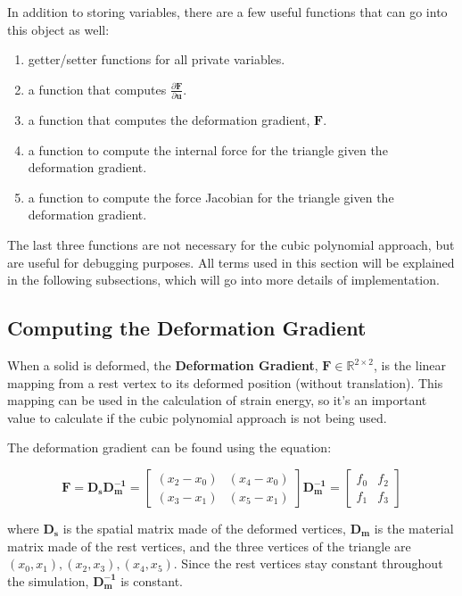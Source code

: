 \documentclass[twocolumn,10pt]{asme2ej}
\begin{document}
In addition to storing variables, there are a few useful functions that can go into this object as well:
\begin{enumerate}
  \item getter/setter functions for all private variables.
  \item a function that computes $\frac{\partial \bm{F}}{\partial \bm{u}}$.
  \item a function that computes the deformation gradient, $\bm{F}$.
  \item a function to compute the internal force for the triangle given the deformation gradient.
  \item a function to compute the force Jacobian for the triangle given the deformation gradient.
\end{enumerate}

The last three functions are not necessary for the cubic polynomial approach, but are useful for debugging purposes.
All terms used in this section will be explained in the following subsections, which will go into more details of
implementation.

\subsection{Computing the Deformation Gradient}

When a solid is deformed, the \textbf{Deformation Gradient}, $\bm{F} \in \mathbb{R}^{2 \times 2}$, is the linear mapping from a rest vertex to its deformed position (without translation). This mapping can be used in the calculation of strain energy, so it's an important value to calculate if the cubic polynomial approach is not being used.

The deformation gradient can be found using the equation:

\begin{equation}
\bm{F} = \bm{D_sD_{m}^{-1}} = \begin{bmatrix} (x_2 - x_0) & (x_4 - x_0) \\ (x_3 - x_1) & (x_5 - x_1) \end{bmatrix} \bm{D_{m}^{-1}} = \begin{bmatrix} f_0 & f_2 \\ f_1 & f_3 \end{bmatrix}
\label{eq_F}
\end{equation}

\noindent where $\bm{D_s}$ is the spatial matrix made of the deformed vertices, $\bm{D_m}$ is the material matrix made of the rest vertices, and the three vertices of the triangle are $(x_0, x_1), (x_2, x_3), (x_4, x_5)$. Since the rest vertices stay constant throughout the simulation, $\bm{D_{m}^{-1}}$ is constant.
\end{document}
